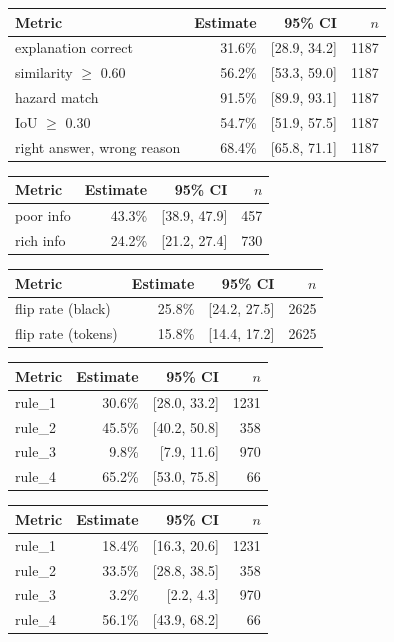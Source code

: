 \begin{tabular}{lrrr}
\toprule
Metric & Estimate & 95\% CI & $n$ \\
\midrule
explanation correct & 31.6\% & [28.9, 34.2] & 1187 \\
similarity $\geq$ 0.60 & 56.2\% & [53.3, 59.0] & 1187 \\
hazard match & 91.5\% & [89.9, 93.1] & 1187 \\
IoU $\geq$ 0.30 & 54.7\% & [51.9, 57.5] & 1187 \\
right answer, wrong reason & 68.4\% & [65.8, 71.1] & 1187 \\
\bottomrule
\end{tabular}

\begin{tabular}{lrrr}
\toprule
Metric & Estimate & 95\% CI & $n$ \\
\midrule
poor info & 43.3\% & [38.9, 47.9] & 457 \\
rich info & 24.2\% & [21.2, 27.4] & 730 \\
\bottomrule
\end{tabular}

\begin{tabular}{lrrr}
\toprule
Metric & Estimate & 95\% CI & $n$ \\
\midrule
flip rate (black) & 25.8\% & [24.2, 27.5] & 2625 \\
flip rate (tokens) & 15.8\% & [14.4, 17.2] & 2625 \\
\bottomrule
\end{tabular}

\begin{tabular}{lrrr}
\toprule
Metric & Estimate & 95\% CI & $n$ \\
\midrule
rule\_1 & 30.6\% & [28.0, 33.2] & 1231 \\
rule\_2 & 45.5\% & [40.2, 50.8] & 358 \\
rule\_3 & 9.8\% & [7.9, 11.6] & 970 \\
rule\_4 & 65.2\% & [53.0, 75.8] & 66 \\
\bottomrule
\end{tabular}

\begin{tabular}{lrrr}
\toprule
Metric & Estimate & 95\% CI & $n$ \\
\midrule
rule\_1 & 18.4\% & [16.3, 20.6] & 1231 \\
rule\_2 & 33.5\% & [28.8, 38.5] & 358 \\
rule\_3 & 3.2\% & [2.2, 4.3] & 970 \\
rule\_4 & 56.1\% & [43.9, 68.2] & 66 \\
\bottomrule
\end{tabular}

